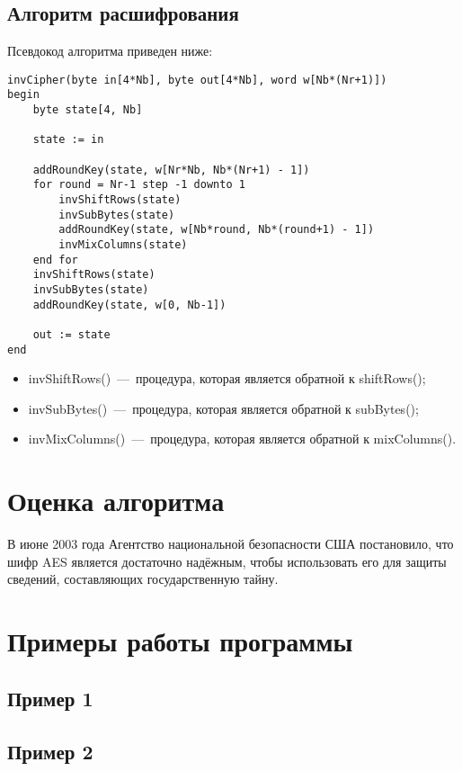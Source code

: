 \documentclass[utf8x, 14pt, bold, times]{G7-32} %
\begin{document}
\section{Алгоритм расшифрования}

Псевдокод алгоритма приведен ниже:\\

\begin{lstlisting}[style=pseudocode]
invCipher(byte in[4*Nb], byte out[4*Nb], word w[Nb*(Nr+1)])
begin
    byte state[4, Nb]
    
    state := in

    addRoundKey(state, w[Nr*Nb, Nb*(Nr+1) - 1])
    for round = Nr-1 step -1 downto 1
        invShiftRows(state)
        invSubBytes(state)
        addRoundKey(state, w[Nb*round, Nb*(round+1) - 1])
        invMixColumns(state)
    end for
    invShiftRows(state)
    invSubBytes(state)
    addRoundKey(state, w[0, Nb-1])

    out := state
end
\end{lstlisting}

\begin{itemize}
\item invShiftRows()~---~процедура, которая является обратной к shiftRows();
\item invSubBytes()~---~процедура, которая является обратной к subBytes();
\item invMixColumns()~---~процедура, которая является обратной к mixColumns(). 
\end{itemize}

\chapter{Оценка алгоритма}

В июне 2003 года Агентство национальной безопасности США постановило, что шифр AES
является достаточно надёжным, чтобы использовать его для защиты сведений, составляющих
государственную тайну.

\chapter{Примеры работы программы}

\section{Пример 1}



\section{Пример 2}
\end{document}
